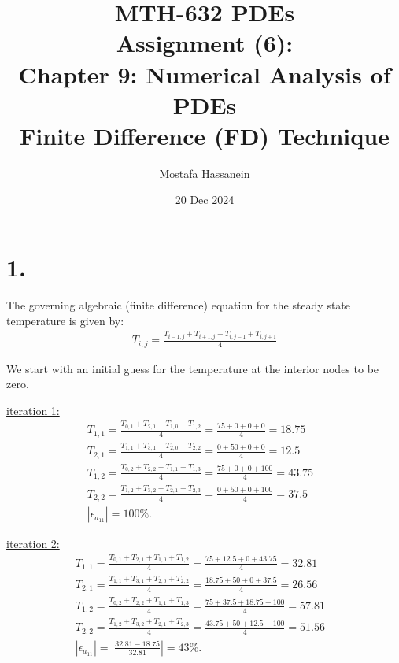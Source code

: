 \documentclass{article}
\author{Mostafa Hassanein}
\title{
  MTH-632 PDEs \\
  Assignment (6): \\ Chapter 9: Numerical Analysis of PDEs \\
  Finite Difference (FD) Technique}
\date{20 Dec 2024}
\begin{document}
\maketitle
\newpage

\section*{1.}

The governing algebraic (finite difference) equation for the steady state temperature is given by:
\begin{align*}
  T_{i,j} = \frac{T_{i-1,j} + T_{i+1,j} + T_{i,j-1} + T_{i,j+1}}{4}
\end{align*}

We start with an initial guess for the temperature at the interior nodes to be zero.
\newline

\underline{iteration 1:}
\begin{align*}
  &T_{1,1} = \frac{T_{0,1} + T_{2,1} + T_{1,0} + T_{1,2}}{4}
  = \frac{75 + 0 + 0 + 0}{4} = 18.75 &&\\
  &T_{2,1} = \frac{T_{1,1} + T_{3,1} +  T_{2,0} + T_{2,2}}{4}
  = \frac{0 + 50 + 0 + 0}{4} = 12.5 &&\\
  &T_{1,2} = \frac{T_{0,2} + T_{2,2} +  T_{1,1} + T_{1,3}}{4}
  = \frac{75 + 0 + 0 + 100}{4} = 43.75 &&\\
  &T_{2,2} = \frac{T_{1,2} + T_{3,2} +  T_{2,1} + T_{2,3}}{4}
  = \frac{0 + 50 + 0 + 100}{4} = 37.5 &&\\
  &\left|\epsilon_{a_{11}}\right| = 100\%.
\end{align*}

\underline{iteration 2:}
\begin{align*}
  &T_{1,1} = \frac{T_{0,1} + T_{2,1} + T_{1,0} + T_{1,2}}{4}
  = \frac{75 + 12.5 + 0 + 43.75}{4} = 32.81 &&\\
  &T_{2,1} = \frac{T_{1,1} + T_{3,1} +  T_{2,0} + T_{2,2}}{4}
  = \frac{18.75 + 50 + 0 + 37.5}{4} = 26.56 &&\\
  &T_{1,2} = \frac{T_{0,2} + T_{2,2} +  T_{1,1} + T_{1,3}}{4}
  = \frac{75 + 37.5 + 18.75 + 100}{4} = 57.81 &&\\
  &T_{2,2} = \frac{T_{1,2} + T_{3,2} +  T_{2,1} + T_{2,3}}{4}
  = \frac{43.75 + 50 + 12.5 + 100}{4} = 51.56 &&\\
  &\left|\epsilon_{a_{11}}\right| = \left|\frac{32.81 - 18.75}{32.81}\right| = 43\%.
\end{align*}
\end{document}
